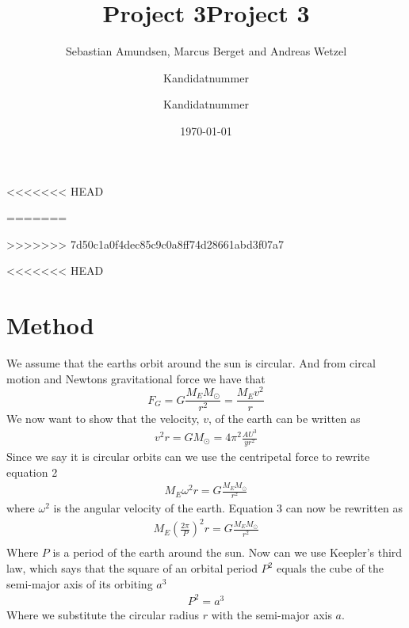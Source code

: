 \documentclass{article}
\begin{document}
\title{Project 3}
<<<<<<< HEAD
\author{Sebastian Amundsen, Marcus Berget and Andreas Wetzel}



\title{Project 3}
\author{Kandidatnummer}

\date{\today}
=======
\author{Kandidatnummer}
>>>>>>> 7d50c1a0f4dec85c9c0a8ff74d28661abd3f07a7

\maketitle

\begin{abstract}

\end{abstract}

\begin{multicols}{2}

<<<<<<< HEAD

\section{Method}
We assume that the earths orbit around the sun is circular. And from circal motion and Newtons gravitational force we have that
\begin{equation}
    F_G=G\frac{M_EM_{\odot}}{r^2}=\frac{M_Ev^2}{r}
\end{equation}
We now want to show that the velocity, $v$, of the earth can be written as
\begin{align}
    v^2r=GM_{\odot}=4\pi^2\frac{AU^3}{yr^2}
\end{align}
Since we say it is circular orbits  can we use the centripetal force to rewrite equation 2 
\begin{align}
    M_E\omega^2r=G\frac{M_EM_{\odot}}{r^2}
\end{align}
where $\omega^2$ is the angular velocity of the earth. Equation 3 can now be rewritten as 
\begin{align}
    M_E(\frac{2\pi}{P})^2r=G\frac{M_EM_{\odot}}{r^2}\\
\end{align}
Where $P$ is a period of the earth around the sun.
Now can we use Keepler's third law, which says that the square of an orbital period $P^2$ equals the cube of the semi-major axis of its orbiting $a^3$
\begin{align}
    P^2=a^3
\end{align}
Where we substitute the circular radius $r$ with the semi-major axis $a$. 


\end{multicols}
\end{document}
